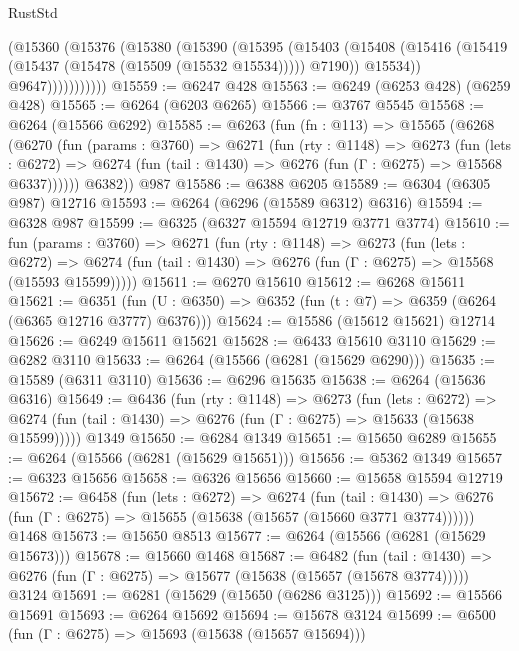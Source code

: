 \begin{lexlean}{RustStd}
\begin{coremodule}
                  (@15360
                    (@15376
                      (@15380
                        (@15390
                          (@15395
                            (@15403
                              (@15408
                                (@15416 (@15419 (@15437 (@15478 (@15509 (@15532 @15534))))) @7190))
                              @15534))
                          @9647)))))))))))
@15559 := @6247 @428
@15563 := @6249 (@6253 @428) (@6259 @428)
@15565 := @6264 (@6203 @6265)
@15566 := @3767 @5545
@15568 := @6264 (@15566 @6292)
@15585 := @6263
    (fun (fn : @113) =>
    @15565
      (@6268
        (@6270
          (fun (params : @3760) =>
          @6271
            (fun (rty : @1148) =>
            @6273
              (fun (lets : @6272) =>
              @6274 (fun (tail : @1430) => @6276 (fun (Γ : @6275) => @15568 @6337))))))
        @6382))
    @987
@15586 := @6388 @6205
@15589 := @6304 (@6305 @987) @12716
@15593 := @6264 (@6296 (@15589 @6312) @6316)
@15594 := @6328 @987
@15599 := @6325 (@6327 @15594 @12719 @3771 @3774)
@15610 := fun (params : @3760) =>
  @6271
    (fun (rty : @1148) =>
    @6273
      (fun (lets : @6272) =>
      @6274 (fun (tail : @1430) => @6276 (fun (Γ : @6275) => @15568 (@15593 @15599)))))
@15611 := @6270 @15610
@15612 := @6268 @15611
@15621 := @6351
    (fun (U : @6350) => @6352 (fun (t : @7) => @6359 (@6264 (@6365 @12716 @3777) @6376)))
@15624 := @15586 (@15612 @15621) @12714
@15626 := @6249 @15611 @15621
@15628 := @6433 @15610 @3110
@15629 := @6282 @3110
@15633 := @6264 (@15566 (@6281 (@15629 @6290)))
@15635 := @15589 (@6311 @3110)
@15636 := @6296 @15635
@15638 := @6264 (@15636 @6316)
@15649 := @6436
    (fun (rty : @1148) =>
    @6273
      (fun (lets : @6272) =>
      @6274 (fun (tail : @1430) => @6276 (fun (Γ : @6275) => @15633 (@15638 @15599)))))
    @1349
@15650 := @6284 @1349
@15651 := @15650 @6289
@15655 := @6264 (@15566 (@6281 (@15629 @15651)))
@15656 := @5362 @1349
@15657 := @6323 @15656
@15658 := @6326 @15656
@15660 := @15658 @15594 @12719
@15672 := @6458
    (fun (lets : @6272) =>
    @6274
      (fun (tail : @1430) =>
      @6276 (fun (Γ : @6275) => @15655 (@15638 (@15657 (@15660 @3771 @3774))))))
    @1468
@15673 := @15650 @8513
@15677 := @6264 (@15566 (@6281 (@15629 @15673)))
@15678 := @15660 @1468
@15687 := @6482
    (fun (tail : @1430) => @6276 (fun (Γ : @6275) => @15677 (@15638 (@15657 (@15678 @3774)))))
    @3124
@15691 := @6281 (@15629 (@15650 (@6286 @3125)))
@15692 := @15566 @15691
@15693 := @6264 @15692
@15694 := @15678 @3124
@15699 := @6500 (fun (Γ : @6275) => @15693 (@15638 (@15657 @15694)))

\end{coremodule}
\end{lexlean}
